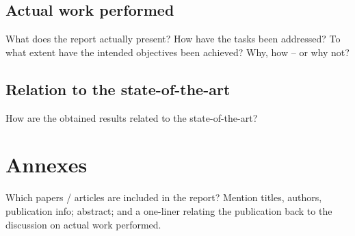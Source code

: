 \documentclass[a4paper,11pt,pdf]{pacmanreport}
\begin{document}
\subsection{Actual work performed}

What does the report actually present? How have the tasks been addressed? To what extent have the intended objectives been achieved? Why, how -- or why not? 

\subsection{Relation to the state-of-the-art}

How are the obtained results related to the state-of-the-art? 

\section{Annexes}

Which papers / articles are included in the report? Mention titles, authors, publication info; abstract; and a one-liner relating the publication back to the discussion on actual work performed. 

%
%
\end{document}
